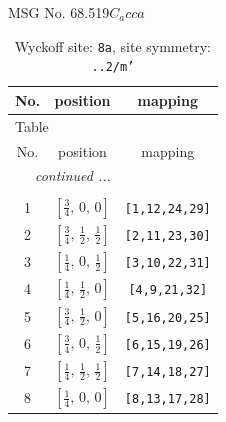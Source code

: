 \documentclass[fleqn,8pt]{jsarticle}
\begin{document}
\setcounter{MaxMatrixCols}{32}

\renewcommand{\tablename}{Table~}
\renewcommand{\figurename}{Figure~}
\begin{center}
\LARGE
MSG No. 68.519\quad$C_{a}cca$
\end{center}
\renewcommand{\arraystretch}{1.2}
\begin{longtable}{ccc}
\caption{Wyckoff site: {\tt 8a}, site symmetry: {\tt ..2/m'}}
 \\
 \hline \hline
No. & position & mapping \\ \hline \endfirsthead

\multicolumn{2}{l}{\tablename\ \thetable{}} \\
 \hline \hline
No. & position & mapping \\ \hline \endhead

 \hline \hline
\multicolumn{2}{r}{\footnotesize\it continued ...} \\ \endfoot

 \hline \hline
\multicolumn{2}{r}{} \\ \endlastfoot

1 & $\left[ \frac{3}{4},\, 0,\, 0 \right]$ & {\tt [1,12,24,29]} \\ \hline
2 & $\left[ \frac{3}{4},\, \frac{1}{2},\, \frac{1}{2} \right]$ & {\tt [2,11,23,30]} \\ \hline
3 & $\left[ \frac{1}{4},\, 0,\, \frac{1}{2} \right]$ & {\tt [3,10,22,31]} \\ \hline
4 & $\left[ \frac{1}{4},\, \frac{1}{2},\, 0 \right]$ & {\tt [4,9,21,32]} \\ \hline
5 & $\left[ \frac{3}{4},\, \frac{1}{2},\, 0 \right]$ & {\tt [5,16,20,25]} \\ \hline
6 & $\left[ \frac{3}{4},\, 0,\, \frac{1}{2} \right]$ & {\tt [6,15,19,26]} \\ \hline
7 & $\left[ \frac{1}{4},\, \frac{1}{2},\, \frac{1}{2} \right]$ & {\tt [7,14,18,27]} \\ \hline
8 & $\left[ \frac{1}{4},\, 0,\, 0 \right]$ & {\tt [8,13,17,28]} \\
\end{longtable}
\renewcommand{\arraystretch}{1.2}
\end{document}
